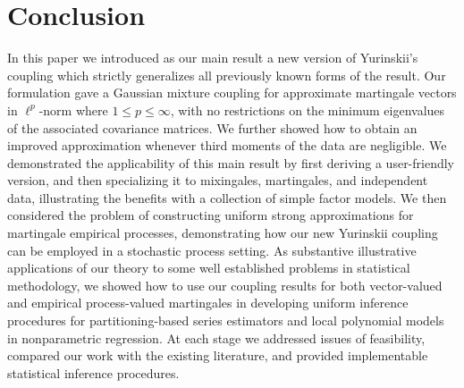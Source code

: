 \section{Conclusion}
\label{sec:yurinskii_conclusion}

In this paper we introduced as our main result a new version of Yurinskii's
coupling which strictly generalizes all previously known forms of the result.
Our formulation gave a Gaussian mixture coupling for approximate martingale
vectors in $\ell^p$-norm where $1 \leq p \leq \infty$, with no restrictions on
the minimum eigenvalues of the associated covariance matrices. We further
showed how to obtain an improved approximation whenever third moments of the
data are negligible. We demonstrated the applicability of this main result by
first deriving a user-friendly version, and then specializing it to mixingales,
martingales, and independent data, illustrating the benefits with a collection
of simple factor models. We then considered the problem of constructing uniform
strong approximations for martingale empirical processes, demonstrating how our
new Yurinskii coupling can be employed in a stochastic process setting. As
substantive illustrative applications of our theory to some
well established %
problems in statistical methodology, we showed how to use our coupling results
for both vector-valued and empirical process-valued martingales in developing
uniform inference procedures for partitioning-based series estimators and local
polynomial models in nonparametric regression.
At each stage we addressed issues of feasibility, compared our work with the
existing literature, and provided implementable statistical inference
procedures.
